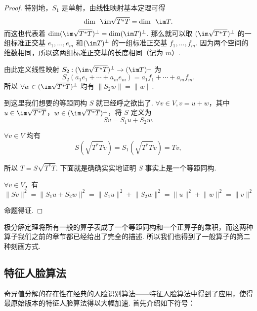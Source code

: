 \begin{proof}
    特别地，$ S_1 $ 是单射，由线性映射基本定理可得
    \[ \dim \enspace \im \sqrt{T^*T} = \dim \enspace \im T. \]
    而这也代表着 $ \dim(\im \sqrt{T^*T})^{\perp} = \dim(\im T)^{\perp} $. 那么就可以取 $ (\im \sqrt{T^*T})^{\perp} $ 的一组标准正交基 $ e_1, \ldots , e_m $ 和$ (\im T)^{\perp} $ 的一组标准正交基 $ f_1, \ldots, f_m $. 因为两个空间的维数相同，所以这两组标准正交基的长度相同（记为 $ m $）.

    由此定义线性映射 $ S_2: (\im \sqrt{T^*T})^{\perp} \rightarrow (\im T)^{\perp} $ 为
    \[ S_2(a_1e_1 + \cdots + a_me_m) = a_1f_1 + \cdots + a_mf_m. \]
    所以 $ \forall w \in (\im \sqrt{T^*T})^{\perp} $ 均有 $ \lVert S_2w \rVert = \lVert w \rVert $.

    到这里我们想要的等距同构 $ S $ 就已经呼之欲出了. $ \forall v \in V, v = u + w $，其中 $ u \in \im \sqrt{T^*T} $，$ w \in (\im \sqrt{T^*T})^{\perp} $，将 $ S $ 定义为
    \[ Sv = S_1u + S_2w. \]

    $ \forall v \in V $ 均有
    \[ S(\sqrt{T^*T}v) = S_1(\sqrt{T^*T}v) = Tv, \]

    所以 $ T = S\sqrt{T^*T} $. 下面就是确确实实地证明 $ S $ 事实上是一个等距同构.

    $ \forall v \in V $，有
    \[ \lVert Sv \rVert^2 = \lVert S_1u + S_2w \rVert^2     = \lVert S_1u \rVert^2 + \lVert S_2w \rVert^2 = \lVert u \rVert^2 + \lVert w \rVert^2 = \lVert v \rVert^2 \]

    命题得证.
\end{proof}

极分解定理将所有一般的算子表成了一个等距同构和一个正算子的乘积，而这两种算子我们之前的章节都已经给出了完全的描述. 所以我们也得到了一般算子的第二种刻画方式.

\subsection{特征人脸算法}

奇异值分解的存在性在经典的人脸识别算法——特征人脸算法中得到了应用，使得最原始版本的特征人脸算法得以大幅加速. 首先介绍如下符号：

